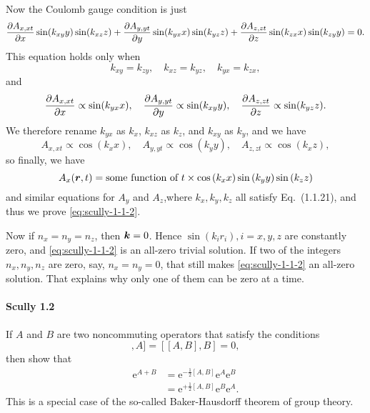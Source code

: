 \documentclass[hyperref, a4paper]{article}
\newcommand*{\ee}{\mathrm{e}}
\begin{document}
Now the Coulomb gauge condition is just
\[
    \pdv{A_{x, xt}}{x} \sin(k_{xy} y) \sin(k_{xz} z) + \pdv{A_{y, yt}}{y} \sin(k_{yx} x) \sin(k_{yz} z) + \pdv{A_{z, zt}}{z} \sin(k_{zx} x) \sin(k_{zy} y) = 0.
\]
This equation holds only when
\[
    k_{xy} = k_{zy}, \quad k_{xz} = k_{yz}, \quad k_{yx} = k_{zx},
\]
and
\[
    \pdv{A_{x, xt}}{x} \propto \sin(k_{yx} x), \quad \pdv{A_{y, yt}}{y} \propto \sin(k_{xy} y) , \quad \pdv{A_{z, zt}}{z} \propto \sin(k_{yz} z).
\]
We therefore rename $k_{yx}$ as $k_x$, $k_{xz}$ as $k_z$, and $k_{xy}$ as $k_y$, and we have
\[
    A_{x, xt} \propto \cos(k_x x), \quad A_{y, yt} \propto \cos(k_y y), \quad A_{z, zt} \propto \cos(k_x z),
\]
so finally, we have 
\[
    A_x(\vb*{r}, t) = \text{some function of $t$} \times \cos \left(k_{x} x\right) \sin \left(k_{y} y\right) \sin \left(k_{z} z\right)
\]
and similar equations for $A_y$ and $A_z$,where $k_x, k_y, k_z$ all satisfy Eq.~(1.1.21), and thus we prove \eqref{eq:scully-1-1-2}.

Now if $n_x = n_y = n_z$, then $\vb*{k} = 0$. Hence $\sin(k_i r_i), i = x, y, z$ are constantly zero, and \eqref{eq:scully-1-1-2} is an all-zero trivial solution.
If two of the integers $n_x, n_y, n_z$ are zero, say, $n_x = n_y = 0$, that still makes \eqref{eq:scully-1-1-2} an all-zero solution.
That explains why only one of them can be zero at a time.

\paragraph{Scully 1.2} If $A$ and $B$ are two noncommuting operators that satisfy the conditions
\begin{equation}
    [[A, B], A]=[[A, B], B]=0,
    \label{eq:scully-1-2-1}
\end{equation}
then show that
\begin{equation}
    \begin{aligned}
        \ee^{A+B} &= \ee^{-\frac{1}{2}[A, B]} \ee^{A} \ee^{B} \\
        &= \ee^{+\frac{1}{2}[A, B]} \ee^{B} \ee^{A}.
    \end{aligned}
    \label{eq:scully-1-2-2}    
\end{equation}
This is a special case of the so-called Baker-Hausdorff theorem of group theory.
\end{document}
